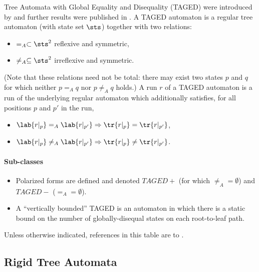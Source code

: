 Tree Automata with Global Equality and Disequality (TAGED) were introduced
by \cite{filiot:sltv} and further results were published in
\cite{filiot:tagc}.  A TAGED automaton is a regular tree automaton (with
state set $\sts$) together with two relations:
\begin{itemize}
  \item $=_A \subset \sts^2$ reflexive and symmetric,
  \item $\neq_A \subseteq \sts^2$ irreflexive and symmetric.
\end{itemize}
%
(Note that these relations need not be total: there may exist two states $p$
and $q$ for which neither $p =_A q$ nor $p \neq_A q$ holds.)
%
A run $r$ of a TAGED automaton is a run of the underlying regular automaton
which additionally satisfies, for all positions $p$ and $p'$ in the run,
\begin{itemize}
  \item $\lab{r|_p} =_A    \lab{r|_{p'}} \Rightarrow \tr{r|_p} = \tr{r|_{p'}}$,
  \item $\lab{r|_p} \neq_A \lab{r|_{p'}} \Rightarrow \tr{r|_p} \neq \tr{r|_{p'}}$.
\end{itemize}

\paragraph{Sub-classes}
\begin{itemize}
%
  \item Polarized forms are defined and denoted $TAGED+$ (for which $\neq_A = \emptyset$) and $TAGED-$ ($=_A = \emptyset$).
%
  \item A ``vertically bounded'' TAGED is an automaton in which
there is a static bound on the number of globally-disequal states on each
root-to-leaf path. 
%
\end{itemize}

Unless otherwise indicated, references in this table are to
\cite{filiot:tagc}.

\subsection{Rigid Tree Automata}
\label{sec:zoo-tree/rta}

